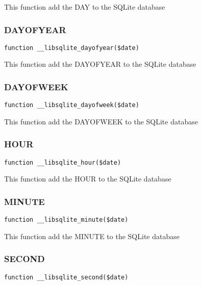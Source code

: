 \documentclass[a4paper]{article}
\begin{document}
This function add the DAY to the SQLite database

\hypertarget{toc306}{}
\subsubsection{DAYOFYEAR}

\begin{lstlisting}
function __libsqlite_dayofyear($date)
\end{lstlisting}

This function add the DAYOFYEAR to the SQLite database

\hypertarget{toc307}{}
\subsubsection{DAYOFWEEK}

\begin{lstlisting}
function __libsqlite_dayofweek($date)
\end{lstlisting}

This function add the DAYOFWEEK to the SQLite database

\hypertarget{toc308}{}
\subsubsection{HOUR}

\begin{lstlisting}
function __libsqlite_hour($date)
\end{lstlisting}

This function add the HOUR to the SQLite database

\hypertarget{toc309}{}
\subsubsection{MINUTE}

\begin{lstlisting}
function __libsqlite_minute($date)
\end{lstlisting}

This function add the MINUTE to the SQLite database

\hypertarget{toc310}{}
\subsubsection{SECOND}

\begin{lstlisting}
function __libsqlite_second($date)
\end{lstlisting}
\end{document}
